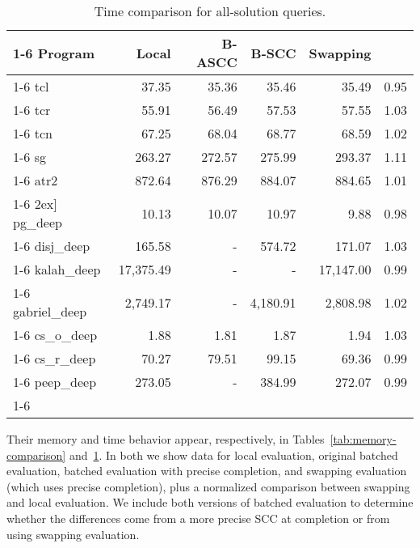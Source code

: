 \documentclass{./tlp}
\newcommand{\redfig}{\vspace{-1em}}
\begin{document}
\begin{table}[t]
\bigskip

\begin{tabular}{|l|r|r|r|r|c|}  
    \cline{1-6} 
    Program   & Local   & B-ASCC  & B-SCC   & Swapping & 
    \\\cline{1-6}\cline{1-6}                       
    tcl       & 37.35 & 35.36 & 35.46 & 35.49 & 0.95
    \\\cline{1-6}                                            
    tcr      & 55.91 & 56.49 & 57.53 & 57.55 & 1.03
    \\\cline{1-6}                                        
    tcn      & 67.25 & 68.04 & 68.77 & 68.59 & 1.02
    \\\cline{1-6}                                        
    sg      & 263.27 & 272.57 & 275.99 & 293.37 & 1.11
    \\\cline{1-6}                                        
    atr2      & 872.64 & 876.29 & 884.07 & 884.65 & 1.01
    \\\cline{1-6}                                        
    \multicolumn{6}{c}{}
    \-2ex]\cline{1-6}             
    pg\_deep      & 10.13 & 10.07 & 10.97 & 9.88 & 0.98  
    \\\cline{1-6}                                    
    disj\_deep    & 165.58 &    -    & 574.72 & 171.07 & 1.03 
    \\\cline{1-6}                                    
    kalah\_deep   & 17,375.49 &    -    &    -    & 17,147.00 & 0.99
     \\\cline{1-6}                                   
    gabriel\_deep & 2,749.17 &    -    & 4,180.91 & 2,808.98 & 1.02
    \\\cline{1-6}                                    
    cs\_o\_deep   & 1.88  & 1.81  & 1.87  & 1.94 &  1.03
    \\\cline{1-6}                                    
    cs\_r\_deep   & 70.27 & 79.51 & 99.15 & 69.36 & 0.99
    \\\cline{1-6}                                                           
    peep\_deep    & 273.05 &    -    & 384.99 & 272.07 & 0.99
\\\cline{1-6}   \end{tabular} 
  \caption{Time comparison for all-solution queries.} 
\label{tab:time-comparison} 
\redfig
\end{table} 


Their memory and time behavior appear, respectively, in
Tables~\ref{tab:memory-comparison} and~\ref{tab:time-comparison}.  In
both we show data for local evaluation, original batched evaluation,
batched evaluation with precise completion, and swapping evaluation
(which uses precise completion), plus a normalized comparison between
swapping and local evaluation.  We include both versions of batched
evaluation to determine whether the differences come from a more
precise SCC at completion or from using swapping evaluation.
\end{document}
